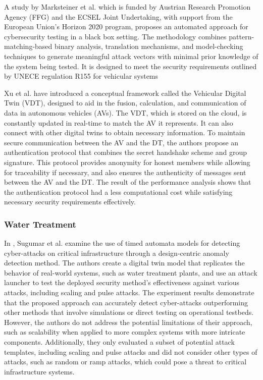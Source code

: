 A study by Marksteiner et al. \cite{marksteinerUsingCyberDigital2021} which is funded by Austrian Research Promotion Agency (FFG) and the ECSEL Joint Undertaking, with support from the European Union's Horizon 2020 program, proposes an automated approach for cybersecurity testing in a black box setting. The methodology combines pattern-matching-based binary analysis, translation mechanisms, and model-checking techniques to generate meaningful attack vectors with minimal prior knowledge of the system being tested. It is designed to meet the security requirements outlined by UNECE regulation R155 for vehicular systems  

Xu et al.\cite{xuEfficientAuthenticationVehicular2021} have introduced a conceptual framework called the Vehicular Digital Twin (VDT), designed to aid in the fusion, calculation, and communication of data in autonomous vehicles (AVs). The VDT, which is stored on the cloud, is constantly updated in real-time to match the AV it represents. It can also connect with other digital twins to obtain necessary information. To maintain secure communication between the AV and the DT, the authors propose an authentication protocol that combines the secret handshake scheme and group signature. This protocol provides anonymity for honest members while allowing for traceability if necessary, and also ensures the authenticity of messages sent between the AV and the DT. The result of the performance analysis shows that the authentication protocol had a less computational cost while satisfying necessary security requirements effectively. 

\subsubsection{Water Treatment}
In \cite{sugumarAssessmentMethodDetecting2019}, Sugumar et al. examine the use of timed automata models for detecting cyber-attacks on critical infrastructure through a design-centric anomaly detection method. The authors create a digital twin model that replicates the behavior of real-world systems, such as water treatment plants, and use an attack launcher to test the deployed security method's effectiveness against various attacks, including scaling and pulse attacks. The experiment results demonstrate that the proposed approach can accurately detect cyber-attacks outperforming other methods that involve simulations or direct testing on operational testbeds. However, the authors do not address the potential limitations of their approach, such as scalability when applied to more complex systems with more intricate components. Additionally, they only evaluated a subset of potential attack templates, including scaling and pulse attacks and did not consider other types of attacks, such as random or ramp attacks, which could pose a threat to critical infrastructure systems. 

